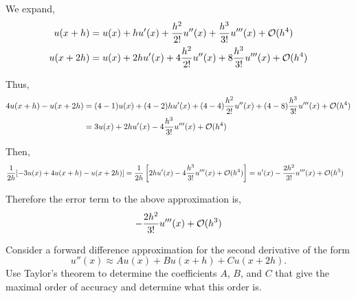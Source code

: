 \documentclass[10pt]{article}
\begin{document}
\begin{solution}[Solution]
We expand,
\begin{align*}
    u(x+h) &= u(x) + h u'(x) + \dfrac{h^2}{2!}u''(x) + \dfrac{h^3}{3!}u'''(x) + \mathcal{O}(h^4) \\
    u(x+2h) &= u(x) + 2h u'(x) + 4\dfrac{h^2}{2!}u''(x) + 8\dfrac{h^3}{3!}u'''(x) + \mathcal{O}(h^4) 
\end{align*}

Thus,
\begin{align*}
    4u(x+h)-u(x+2h) &= (4-1)u(x) + (4-2)h u'(x) + (4-4)\dfrac{h^2}{2!}u''(x) + (4-8) \dfrac{h^3}{3!}u'''(x) + \mathcal{O}(h^4) \\
    &= 3u(x) +2 h u'(x) - 4 \dfrac{h^3}{3!}u'''(x) + \mathcal{O}(h^4)
\end{align*}

Then,
\begin{align*}
    \dfrac{1}{2h}[-3u(x)+4u(x+h) - u(x+2h)] &= \dfrac{1}{2h}\left[2hu'(x) - 4 \dfrac{h^3}{3!}u'''(x) + \mathcal{O}(h^4) \right]
    = u'(x) - \dfrac{2h^2}{3!}u'''(x) + \mathcal{O}(h^3)
\end{align*}

Therefore the error term to the above approximation is,
\begin{align*}
    - \dfrac{2h^2}{3!}u'''(x) + \mathcal{O}(h^3)
\end{align*}
\end{solution}

\begin{problem}[Problem 4]
Consider a forward difference approximation for the second derivative of the form
    \[ u'' (x) \approx A u(x) + B u(x+h) + C u(x+2h) .\]
Use Taylor's theorem to determine the coefficients \(A\), \(B\), and \(C\) that give the maximal order of accuracy and determine what this order is.
\end{problem}
\end{document}
